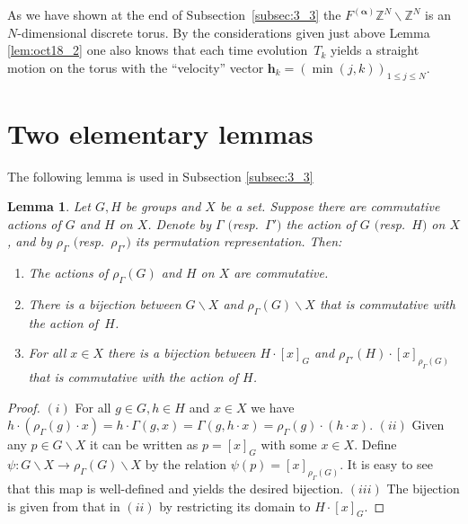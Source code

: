 \documentclass[11pt]{article}
\newtheorem{lemma}{Lemma}
\newcommand{\Z}{{\mathbb Z}}
\newcommand\boa{\boldsymbol{\alpha}}
\begin{document}
As we have shown at the end of Subsection~\ref{subsec:3_3} the $F^{(\boa)} \Z^N \backslash \Z^N$ is an $N$-dimensional discrete torus.
%
By the considerations given just above Lemma \ref{lem:oct18_2} one also knows that
each time evolution~$T_k$ yields a straight motion on the torus with the ``velocity'' vector
$\boldsymbol{h}_k = (\min(j,k))_{1 \leq j \leq N}$.

\setcounter{section}{5}
\setcounter{subsection}{2}
\setcounter{subsubsection}{0}
\setcounter{equation}{18}
\setcounter{lemma}{6}
\appendix
\section{Two elementary lemmas}\label{app:A}
The following lemma is used in Subsection \ref{subsec:3_3}
\begin{lemma}\label{lem:apr8_2}
Let $G, H$ be groups and $X$ be a set.
Suppose there are commutative actions of $G$ and $H$ on $X$.
Denote by $\varGamma$ $($resp.~$\varGamma')$ the action of $G$ $($resp.~$H)$ on $X$, and by $\rho_{\varGamma}$ $($resp.~$\rho_{\varGamma'})$
its permutation representation.
Then:
\begin{enumerate}\itemsep=0pt
\item The actions of $\rho_{\varGamma} (G)$ and $H$ on $X$ are commutative.
\item There is a bijection between $G \backslash X$ and $\rho_{\varGamma} (G) \backslash X$ that is commutative with the
action of~$H$.
\item For all $x \in X$ there is a bijection between $H \cdot [x]_G$ and $\rho_{\varGamma'}(H) \cdot  [x]_{\rho_{\varGamma}(G)}$
that is commutative with the action of $H$.
\end{enumerate}
\end{lemma}
\begin{proof}
$(i)$ For all $g \in G, h \in H$ and $x \in X$ we have $h \cdot (\rho_{\varGamma} (g) \cdot x) = h \cdot \varGamma (g, x)
= \varGamma (g, h \cdot x) = \rho_{\varGamma} (g) \cdot (h \cdot x)$.
$(ii)$ Given any $p \in G \backslash X$ it can be written as $p = [x]_G$ with some $x \in X$.
Def\/ine $\psi: G \backslash X \rightarrow \rho_{\varGamma} (G) \backslash X$ by the relation $\psi (p) = [x]_{\rho_{\varGamma} (G)}$.
It is easy to see that this map is well-def\/ined and yields the desired bijection.
$(iii)$ The bijection is given from that in $(ii)$ by restricting its domain to $H \cdot [x]_G$.
\end{proof}
\end{document}
